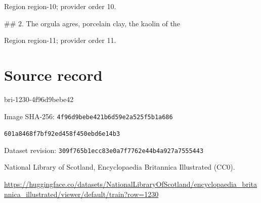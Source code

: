 \documentclass[11pt]{article}
\begin{document}
{\scriptsize\color{gray} Region region-10; provider order 10.\par}
\medskip

\#\# 2. The orgula agres, porcelain clay, the kaolin of the
\par

{\scriptsize\color{gray} Region region-11; provider order 11.\par}
\medskip
\newpage\section*{Source record}
bri-1230-4f96d9bebe42\par
Image SHA-256: \texttt{4f96d9bebe421b6d59e2a525f5b1a686}\par\texttt{601a8468f7bf92ed458f450ebd6e14b3}\par
Dataset revision: \texttt{309f765b1ecc83e0a7f7}\texttt{762e44b4a927a7555443}\par
National Library of Scotland, Encyclopaedia Britannica Illustrated (CC0).\par
\url{https://huggingface.co/datasets/NationalLibraryOfScotland/encyclopaedia_britannica_illustrated/viewer/default/train?row=1230}
\end{document}
